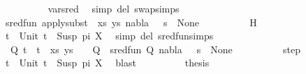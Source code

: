 \begin{isabellebody}
\ \ \ \ \ \ \ \ \isamarkupfalse%
\ var{\isacharunderscore}{\kern0pt}{}{\isacharunderscore}{\kern0pt}sred\ \isamarkupfalse%
\ {\isacharparenleft}{\kern0pt}simp\ del{\isacharcolon}{\kern0pt}\ swap{\isachardot}{\kern0pt}simps{\isacharparenright}{\kern0pt}\isanewline
\ \ \ \ \ \ \isamarkupfalse%
\ {\isachardoublequoteopen}sred{\isacharunderscore}{\kern0pt}fun\ {\isacharparenleft}{\kern0pt}apply{\isacharunderscore}{\kern0pt}subst\ {\isacharquery}{\kern0pt}{\isasymsigma}\ {\isacharparenleft}{\kern0pt}xs{\isacharcomma}{\kern0pt}\ ys{\isacharparenright}{\kern0pt}{\isacharcomma}{\kern0pt}\ nabla{\isacharcomma}{\kern0pt}\ {\isacharquery}{\kern0pt}{\isasymsigma}\ {\isasymbullet}\ s{\isacharparenright}{\kern0pt}\ {\isacharequal}{\kern0pt}\ None{\isachardoublequoteclose}\isanewline
\ \ \ \ \ \ \ \ \isamarkupfalse%
\ H\ \isamarkupfalse%
\ {\isacartoucheopen}t{}\ {\isacharequal}{\kern0pt}\ Unit{\isacartoucheclose}\ {\isacartoucheopen}t{}\ {\isacharequal}{\kern0pt}\ Susp\ pi\ X{\isacartoucheclose}\ \isamarkupfalse%
\ {\isacharparenleft}{\kern0pt}simp\ del{\isacharcolon}{\kern0pt}\ sred{\isacharunderscore}{\kern0pt}fun{\isachardot}{\kern0pt}simps{\isacharparenright}{\kern0pt}\isanewline
\ \ \ \ \ \ \isamarkupfalse%
\ \isamarkupfalse%
\ {\isachardoublequoteopen}{\isasymexists}{\isasymsigma}\ Q{\isachardot}{\kern0pt}\ {\isacharparenleft}{\kern0pt}{\isacharparenleft}{\kern0pt}t{}\ {\isasymapprox}{\isacharquery}{\kern0pt}\ t{}{\isacharparenright}{\kern0pt}\ {\isacharhash}{\kern0pt}\ xs{\isacharcomma}{\kern0pt}\ ys{\isacharparenright}{\kern0pt}\ {\isasymturnstile}\ {\isasymsigma}\ {\isasymleadsto}\ Q\ {\isasymand}\ sred{\isacharunderscore}{\kern0pt}fun\ {\isacharparenleft}{\kern0pt}Q{\isacharcomma}{\kern0pt}\ nabla{\isacharcomma}{\kern0pt}\ {\isasymsigma}\ {\isasymbullet}\ s{\isacharparenright}{\kern0pt}\ {\isacharequal}{\kern0pt}\ None{\isachardoublequoteclose}\isanewline
\ \ \ \ \ \ \ \ \isamarkupfalse%
\ step\ \isamarkupfalse%
\ {\isacartoucheopen}t{}\ {\isacharequal}{\kern0pt}\ Unit{\isacartoucheclose}\ {\isacartoucheopen}t{}\ {\isacharequal}{\kern0pt}\ Susp\ pi\ X{\isacartoucheclose}\ \isamarkupfalse%
\ blast\isanewline
\ \ \ \ \ \ \isamarkupfalse%
\ \isamarkupfalse%
\ {\isacharquery}{\kern0pt}thesis\ \isamarkupfalse%

\end{isabellebody}
